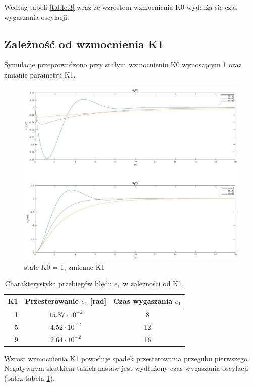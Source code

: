 \documentclass[12pt,a4paper]{article}
\begin{document}
      Według tabeli \ref{table:3} wraz ze wzrostem wzmocnienia K0 wydłuża się czas wygaszania oscylacji.




  \subsection{Zależność od wzmocnienia K1}
  Symulacje przeprowadzono przy stałym wzmocnieniu K0 wynoszącym 1 oraz zmianie parametru K1.

  \begin{figure}[H]
    \centering
    \includegraphics[width=1\textwidth]{figures/lin2.jpg}
    \caption{stałe K0 = 1, zmienne K1}
    \label{fig:lin2}
  \end{figure}

  \begin{table}[h!]
    \centering
    \begin{tabular}{ r | c | c }
      K1 & Przesterowanie $e_1$ [rad] & Czas wygaszania $e_1$ \\ 
      \hline
      1 & $15.87 \cdot 10^{-2}$ & 8  \\
      5 & $4.52  \cdot 10^{-2}$ & 12   \\
      9 & $2.64  \cdot 10^{-2}$ & 16
    \end{tabular}
    \caption{Charakterystyka przebiegów błędu $e_1$ w zależności od K1.}
    \label{table:4}
  \end{table}

    Wzrost wzmocnienia K1 powoduje spadek przesterowania przegubu pierwszego. Negatywnym skutkiem takich nastaw jest wydłużony czas wygaszania oscylacji (patrz tabela \ref{table:4}).
\end{document}
